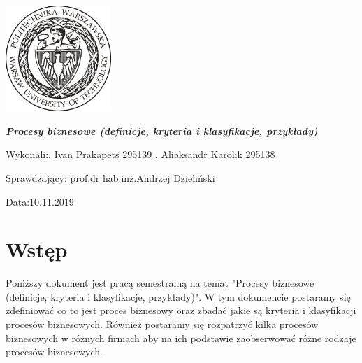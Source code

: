 \documentclass[a4paper, 12pt]{article}
\newcommand{\mainmatter}{\clearpage \cfoot{\thepage\ of \pageref{LastPage}}
\pagenumbering{arabic}}
\begin{document}
	\begin{titlepage}
\includegraphics[width = 40mm]{logo.jpg}
		\begin{center}
    			\vspace{3cm}
    					\Large\textit{\textbf{Procesy biznesowe (definicje, kryteria i klasyfikacje, przykłady)}}
   			\vspace{4cm}
		\end{center} 

		\hfill\begin{minipage}{0.54\textwidth}
			\Large Wykonali:. Ivan Prakapets 295139 . Aliaksandr Karolik 295138
		\vspace{\baselineskip}
		\end{minipage}
		
		\hfill\begin{minipage}{0.54\textwidth}
			\Large Sprawdzający:\newline
		 		prof.dr hab.inż.Andrzej Dzieliński
\vspace{\baselineskip}
		\end{minipage}

		\hfill\begin{minipage}{0.54\textwidth}
			\Large Data:10.11.2019
			\vspace{\baselineskip}
		\end{minipage}
	\end{titlepage}
\newpage
\mainmatter
\setlength{\headheight}{15pt}
\doublespacing
\tableofcontents
\newpage

\linespread{0.5}

\section{Wstęp}
\hspace*{1.5 cm}Poniższy dokument jest  pracą semestralną na temat "Procesy biznesowe (definicje, kryteria i klasyfikacje, przykłady)". W tym dokumencie postaramy się zdefiniować co to jest proces biznesowy oraz zbadać jakie są kryteria i klasyfikacji procesów biznesowych. Również postaramy się rozpatrzyć kilka procesów biznesowych w różnych firmach aby na ich podstawie zaobserwować różne rodzaje procesów biznesowych. 
\end{document}
